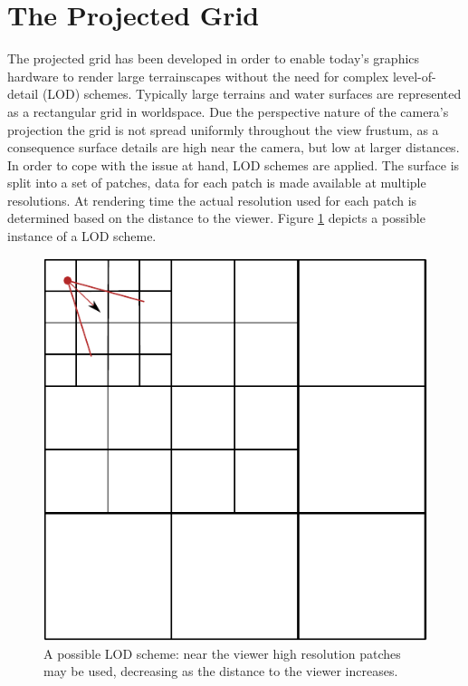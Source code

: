 \section{The Projected Grid}
The projected grid has been developed in order to enable today's graphics
hardware to render large terrainscapes without the need for complex
level-of-detail (LOD) schemes. Typically large terrains and water surfaces are
represented as a rectangular grid in worldspace. Due the perspective nature of
the camera's projection the grid is not spread uniformly throughout the view
frustum, as a consequence surface details are high near the camera, but low at
larger distances. In order to cope with the issue at hand, LOD schemes are
applied. The surface is split into a set of patches, data for each patch is
made available at multiple resolutions. At rendering time the actual resolution
used for each patch is determined based on the distance to the viewer. Figure
\ref{fig:lodscheme} depicts a possible instance of a LOD scheme.
\begin{figure}
\begin{center}
\includegraphics[scale=1.0]{Images/LODScheme.pdf}
\caption[LOD scheme]{A possible LOD scheme: near the viewer high resolution
patches may be used, decreasing as the distance to the viewer increases. }
\label{fig:lodscheme}
\end{center}
\end{figure}
